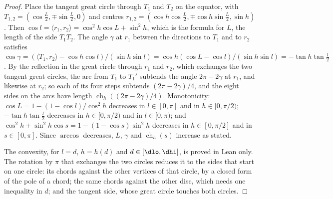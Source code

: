 {\begin{proof}
Place the tangent great circle through $T_1$ and $T_2$ on the equator, with $T_{1,2}=(\cos\frac L2,\mp\sin\frac L2,0)$ and centres $r_{1,2}=(\cos h\cos\frac L2,\mp\cos h\sin\frac L2,\sin h)$. Then $\cos l=\langle r_1,r_2\rangle=\cos^2h\cos L+\sin^2h$, which is the formula for $L$, the length of the side $T_1T_2$. The angle $\gamma$ at $r_1$ between the directions to $T_1$ and to $r_2$ satisfies $\cos\gamma=(\langle T_1,r_2\rangle-\cos h\cos l)/(\sin h\sin l)=\cos h(\cos L-\cos l)/(\sin h\sin l)=-\tan h\tan\frac l2$. By the reflection in the great circle through $r_1$ and $r_2$, which exchanges the two tangent great circles, the arc from $T_1$ to $T_1'$ subtends the angle $2\pi-2\gamma$ at $r_1$, and likewise at $r_2$; so each of its four steps subtends $(2\pi-2\gamma)/4$, and the eight sides on the arcs have length $\operatorname{ch}_h((2\pi-2\gamma)/4)$. Monotonicity: $\cos L=1-(1-\cos l)/\cos^2h$ decreases in $l\in[0,\pi]$ and in $h\in[0,\pi/2)$; $-\tan h\tan\frac l2$ decreases in $h\in[0,\pi/2)$ and in $l\in[0,\pi)$; and $\cos^2h+\sin^2h\cos s=1-(1-\cos s)\sin^2h$ decreases in $h\in[0,\pi/2]$ and in $s\in[0,\pi]$. Since $\arccos$ decreases, $L$, $\gamma$ and $\operatorname{ch}_h(s)$ increase as stated.

The convexity, for $l=d$, $h=h(d)$ and $d\in[\dlo,\dhi]$, is proved in Lean only. The rotation by $\pi$ that exchanges the two circles reduces it to the sides that start on one circle: its chords against the other vertices of that circle, by a closed form of the pole of a chord; the same chords against the other disc, which needs one inequality in $d$; and the tangent side, whose great circle touches both circles.
\end{proof}
}

\newcommand{\PolygonOnehexProof}{%
\begin{proof}
Let $r_1,r_2$ be rattlers in a hexagonal face $F$, so $l=\dist(r_1,r_2)>d$, and put $h=h(d)$. By Lemma~\ref{lem:disc}, $D(r_1,h)$ and $D(r_2,h)$ lie in $\cl F$. Let $c$ be the point of $[r_1r_2]$ with $\dist(r_1,c)=d$. By Lemma~\ref{lem:convex}, $\cl F$ is the intersection of the closed hemispheres $\{\langle x,n_i\rangle\ge0\}$ of its sides, and a disc $D(r,h)$ lies in such a hemisphere exactly when $\langle r,n_i\rangle\ge\sin h$. From $c=(\sin(l-d)r_1+\sin d\,r_2)/\sin l$,
\[
\langle c,n_i\rangle\ge\sin h\,\frac{\sin(l-d)+\sin d}{\sin l}=\sin h\,\frac{\cos(l/2-d)}{\cos(l/2)}\ge\sin h ,
\]
so $D(c,h)\subseteq\cl F$. Since $\pi-2h(d)-d$ decreases with $d$ and equals $20.58^\circ$ at $\dhi$, Lemma~\ref{lem:perims} applies to $D(r_1,h)$ and $D(c,h)$ with $l=d$. The ten vertices of its polygon lie in $\cl F$, which is convex, so Lemma~\ref{lem:polar} gives $6d=\per F\ge P_{10}(d,h(d))$. Cut $[\dlo,\dhi]$ into ten equal intervals $[a',b']$, of length $0.301375^\circ$. For $d\in[a',b']$, the monotonicity of Lemma~\ref{lem:perims} and of $h$ gives
\[
P_{10}(d,h(d))-6d\ge2L(a',h(a'))+8\operatorname{ch}_{h(a')}\bigl((2\pi-2\gamma(b',h(b')))/4\bigr)-6b',
\]
and the right side is at least $2.48^\circ$ on each of the ten intervals. This is a contradiction.
\end{proof}
}

